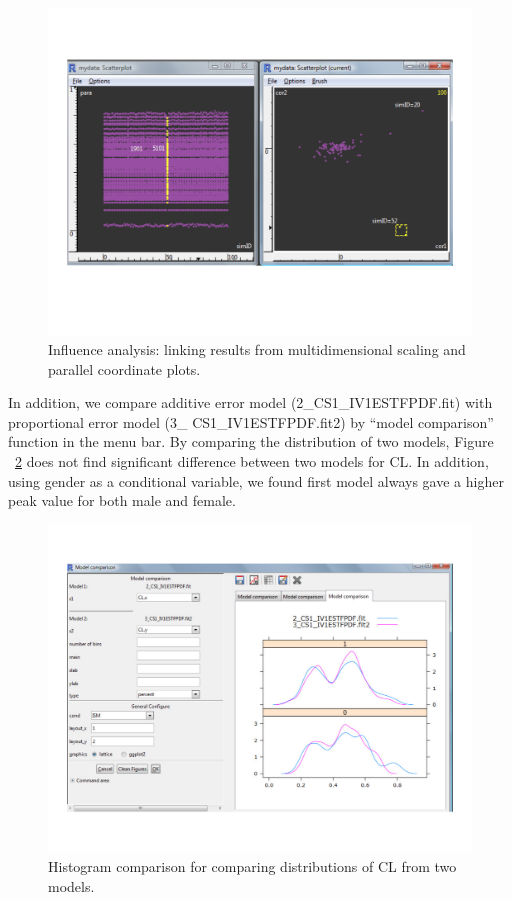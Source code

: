 \documentclass[a4paper]{article}
\begin{document}
\begin{figure}[h!tb]
\centering
\includegraphics[scale=0.6]{c4_s2_8.pdf}
\caption{Influence analysis: linking results from multidimensional scaling and parallel coordinate plots.}
\label{c4_s2_8}
\end{figure}
\newline
\newline
In addition, we compare additive error model (2\_CS1\_IV1ESTFPDF.fit) with proportional error model (3\_ CS1\_IV1ESTFPDF.fit2) by ``model comparison'' function in the menu bar. By comparing the distribution of two models, Figure ~\ref{c4_s2_9} does not find significant difference between two models for CL. In addition, using gender as a conditional variable, we found first model always gave a higher peak value for both male and female.
\begin{figure}[h!tb]
\centering
\includegraphics[scale=0.6]{modelcc2.pdf}
\caption{Histogram comparison for
comparing distributions of CL from two models.}
\label{c4_s2_9}
\end{figure}
\end{document}

